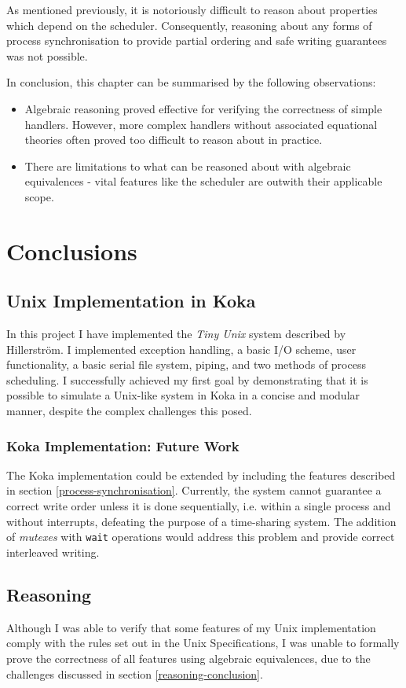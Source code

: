 \documentclass[logo,bsc,singlespacing,parskip]{infthesis}
\begin{document}
As mentioned previously, it is notoriously difficult  to reason about properties which depend on the scheduler. Consequently, reasoning about any forms of process synchronisation to provide partial ordering and safe writing guarantees was not possible.

In conclusion, this chapter can be summarised by the following observations:
\begin{itemize}
    \item Algebraic reasoning proved effective for verifying the correctness of simple handlers. However, more complex handlers without associated equational theories often proved too difficult to reason about in practice.
    \item There are limitations to what can be reasoned about with algebraic equivalences - vital features like the scheduler are outwith their applicable scope.
\end{itemize}


\chapter{Conclusions}

\section{Unix Implementation in Koka}
In this project I have implemented the \textit{Tiny Unix} system described by Hillerström. I implemented exception handling, a basic I/O scheme, user functionality, a basic serial file system, piping, and two methods of process scheduling. I successfully achieved my first goal by demonstrating that it is possible to simulate a Unix-like system in Koka in a concise and modular manner, despite the complex challenges this posed.

\subsection*{Koka Implementation: Future Work}
The Koka implementation could be extended by including the features described in section \ref{process-synchronisation}. Currently, the system cannot guarantee a correct write order unless it is done sequentially, i.e. within a single process and without interrupts, defeating the purpose of a time-sharing system. The addition of \textit{mutexes} with \lstinline{wait} operations would address this problem and provide correct interleaved writing.

\section{Reasoning}
Although I was able to verify that some features of my Unix implementation comply with the rules set out in the Unix Specifications, I was unable to formally prove the correctness  of all features using algebraic equivalences, due to the challenges discussed in section \ref{reasoning-conclusion}.
\end{document}
